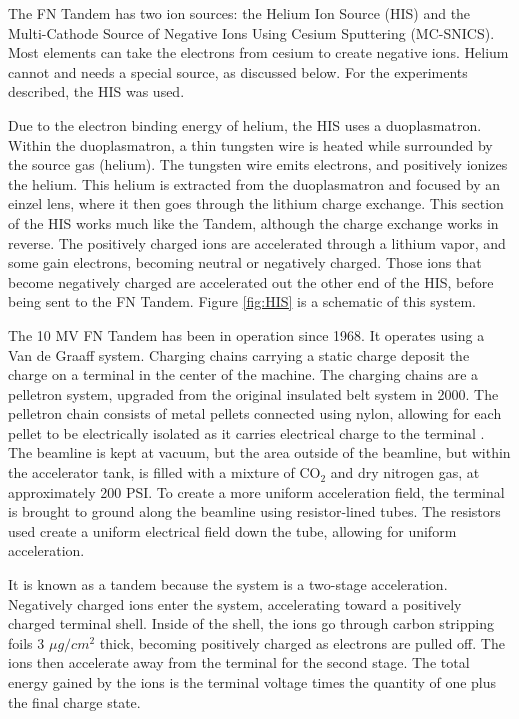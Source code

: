 The FN Tandem has two ion sources: the Helium Ion Source (HIS) and the Multi-Cathode Source of Negative Ions Using Cesium Sputtering (MC-SNICS). Most elements can take the electrons from cesium to create negative ions. Helium cannot and needs a special source, as discussed below. For the experiments described, the HIS was used.

Due to the electron binding energy of helium, the HIS uses a duoplasmatron. Within the duoplasmatron, a thin tungsten wire is heated while surrounded by the source gas (helium). The tungsten wire emits electrons, and positively ionizes the helium. This helium is extracted from the duoplasmatron and focused by an einzel lens, where it then goes through the lithium charge exchange. This section of the HIS works much like the Tandem, although the charge exchange works in reverse. The positively charged ions are accelerated through a lithium vapor, and some gain electrons, becoming neutral or negatively charged. Those ions that become negatively charged are accelerated out the other end of the HIS, before being sent to the FN Tandem. Figure \ref{fig:HIS} is a schematic of this system.



The 10 MV FN Tandem has been in operation since 1968. It operates using a Van de Graaff system. Charging chains carrying a static charge deposit the charge on a terminal in the center of the machine. The charging chains are a pelletron system, upgraded from the original insulated belt system in 2000. The pelletron chain consists of metal pellets connected using nylon, allowing for each pellet to be electrically isolated as it carries electrical charge to the terminal \citep{nec:_pelletron}. The beamline is kept at vacuum, but the area outside of the beamline, but within the accelerator tank, is filled with a mixture of CO$_2$ and dry nitrogen gas, at approximately 200 PSI. To create a more uniform acceleration field, the terminal is brought to ground along the beamline using resistor-lined tubes. The resistors used create a uniform electrical field down the tube, allowing for uniform acceleration.

It is known as a tandem because the system is a two-stage acceleration. Negatively charged ions enter the system, accelerating toward a positively charged terminal shell. Inside of the shell, the ions go through carbon stripping foils 3 $\mu g/cm^2$ thick, becoming positively charged as electrons are pulled off. The ions then accelerate away from the terminal for the second stage. The total energy gained by the ions is the terminal voltage times the quantity of one plus the final charge state.

